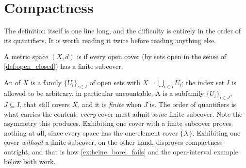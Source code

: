 
\section{Compactness}
\label{sec:compactness}

The definition itself is one line long, and the difficulty is entirely in the order of its
quantifiers. It is worth reading it twice before reading anything else.

\begin{definition}
\label{def:compact_metric_space}
A metric space $(X,d)$ is   if every open cover
(by sets open in the sense of \cref{def:open_closed}) has a finite subcover.
\end{definition}

\begin{notation}
\label{not:open_cover}
An   of $X$ is a family
$\{U_i\}_{i \in I}$ of open sets with $X = \bigcup_{i\in I}U_i$; the index set $I$ is allowed to
be arbitrary, in particular uncountable. A  is a subfamily
$\{U_i\}_{i \in J}$, $J \subseteq I$, that still covers $X$, and it is \emph{finite} when $J$
is. The order of quantifiers is what carries the content: \emph{every} cover must admit
\emph{some} finite subcover. Note the asymmetry this produces. Exhibiting one cover with a finite
subcover proves nothing at all, since every space has the one-element cover $\{X\}$. Exhibiting
one cover \emph{without} a finite subcover, on the other hand, disproves compactness outright,
and that is how \cref{ex:heine_borel_fails} and the open-interval example below both work.
\end{notation}

